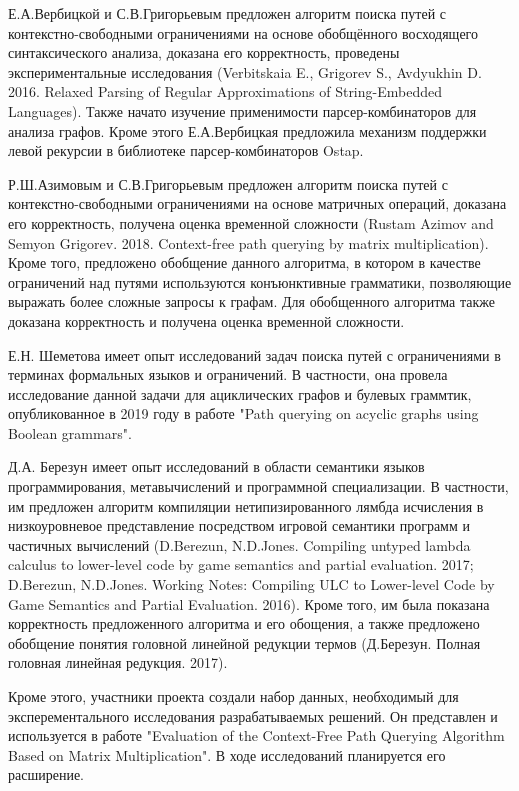 \documentclass[12pt]{article}  %
\theoremstyle{remark}
\begin{document}
Е.А.Вербицкой и С.В.Григорьевым предложен алгоритм поиска путей с контекстно-свободными ограничениями на основе обобщённого восходящего синтаксического анализа, доказана его корректность, проведены экспериментальные исследования (Verbitskaia E., Grigorev S., Avdyukhin D. 2016. Relaxed Parsing of Regular Approximations of String-Embedded Languages). Также начато изучение применимости парсер-комбинаторов для анализа графов. Кроме этого Е.А.Вербицкая предложила механизм поддержки левой рекурсии в библиотеке парсер-комбинаторов Ostap.

Р.Ш.Азимовым и С.В.Григорьевым предложен алгоритм поиска путей с контекстно-свободными ограничениями на основе матричных операций, доказана его корректность, получена оценка временной сложности (Rustam Azimov and Semyon Grigorev. 2018. Context-free path querying by matrix multiplication). Кроме того, предложено обобщение данного алгоритма, в котором в качестве ограничений над путями используются конъюнктивные грамматики, позволяющие выражать более сложные запросы к графам. Для обобщенного алгоритма также доказана корректность и получена оценка временной сложности.

Е.Н. Шеметова имеет опыт исследований задач поиска путей с ограничениями в терминах формальных языков и ограничений. В частности, она провела исследование данной задачи для ациклических графов и булевых граммтик, опубликованное в 2019 году в работе "Path querying on acyclic graphs using Boolean grammars".

Д.А. Березун имеет опыт исследований в области семантики языков программирования, метавычислений и
программной специализации.
В частности, им предложен алгоритм компиляции нетипизированного лямбда исчисления в низкоуровневое
представление посредством игровой семантики программ и частичных вычислений (D.Berezun, N.D.Jones. Compiling untyped lambda calculus to lower-level code by game semantics and partial evaluation. 2017; D.Berezun, N.D.Jones. Working Notes: Compiling ULC to Lower-level Code by Game Semantics and Partial Evaluation. 2016).
Кроме того, им была показана корректность предложенного алгоритма и его обощения, а также предложено обобщение понятия головной линейной редукции термов
(Д.Березун. Полная головная линейная редукция. 2017).

Кроме этого, участники проекта создали набор данных, необходимый для эксперементального исследования разрабатываемых решений. Он представлен и используется в работе "Evaluation of the Context-Free Path Querying Algorithm Based on Matrix Multiplication". В ходе исследований планируется его расширение.
\end{document}
